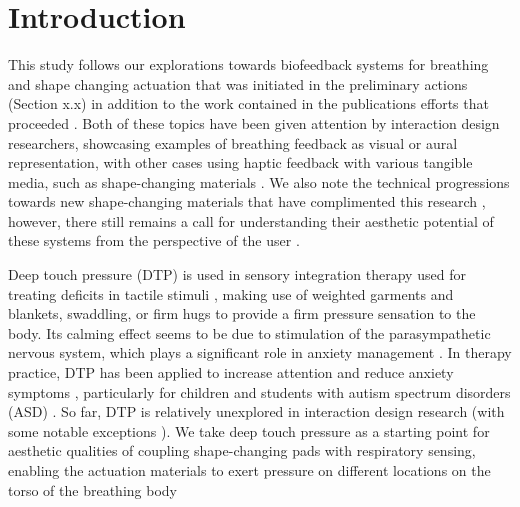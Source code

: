 \section{Introduction}

This study follows our explorations towards biofeedback systems for breathing and shape changing actuation that was initiated in the preliminary actions (Section x.x) in addition to the work contained in the publications efforts that proceeded \cite{sanches_ambiguity_2019, alfaras_biodata_2020}. Both of these topics have been given attention by interaction design researchers, showcasing examples of breathing feedback as visual or aural representation, with other cases using haptic feedback with various tangible media, such as shape-changing materials \cite{prpa_inhaling_2020, pardis}. We also note the technical progressions towards new shape-changing materials that have complimented this research \cite{coelho_shape-changing_2011}, however, there still remains a call for understanding their aesthetic potential of these systems from the perspective of the user \cite{rasmussen_shape-changing_2012,alexander_grand_2018}. 

Deep touch pressure (DTP) is used in sensory integration therapy used for treating deficits in tactile stimuli \cite{bundy_sensory_2002}, making use of weighted garments and blankets, swaddling, or firm hugs to provide a firm pressure sensation to the body. Its calming effect seems to be due to stimulation of the parasympathetic nervous system, which plays a significant role in anxiety management \cite{hsin-yung_chen_physiological_2013}. In therapy practice, DTP has been applied to increase attention \cite{fertel-daly_effects_2001} and reduce anxiety symptoms \cite{krauss_effects_1987}, particularly for children and students with autism spectrum disorders (ASD) \cite{lang_sensory_2012} \cite{alfaras_espinas_making_2021}. So far, DTP is relatively unexplored in interaction design research (with some notable exceptions \cite{delazio_force_2018, duvall_dynamic_2019, foo_user_2019, foo_2020}). We take deep touch pressure as a starting point for aesthetic qualities of coupling shape-changing pads with respiratory sensing, enabling the actuation materials to exert pressure on different locations on the torso of the breathing body

